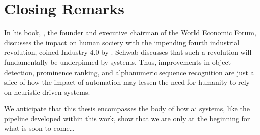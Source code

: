 

\section{Closing Remarks}

In his \citeyear{Schwab:2017vd} book, \citet{Schwab:2017vd}, the founder and executive chairman of the World Economic Forum, discusses the impact on human society with the impending fourth industrial revolution, coined Industry 4.0 by \citet{kagermann2011industrie}. Schwab discusses that such a revolution will fundamentally be underpinned by  systems. Thus, improvements in object detection, prominence ranking, and alphanumeric sequence recognition are just a slice of how the impact of automation may lessen the need for humanity to rely on heuristic-driven systems.

\bigskip
\noindent
We anticipate that this thesis encompasses the body of how \gls{ai} systems, like the pipeline developed within this work, show that we are only at the beginning for what is soon to come\ldots